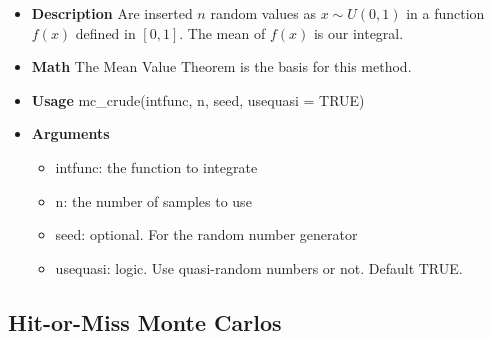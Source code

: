 \documentclass{article}
\begin{document}
\begin{itemize}
    \item \textbf{Description}\newline
    Are inserted $n$ random values as $x \sim U(0, 1)$ in a function $f(x)$ defined in $[0,1]$. The mean of $f(x)$ is our integral.
    
    \item \textbf{Math}\newline
    The Mean Value Theorem is the basis for this method.
    
    \item \textbf{Usage}\newline
    mc\_crude(intfunc, n, seed, usequasi = TRUE)
    
    \item \textbf{Arguments}
    
    \begin{itemize}
        \item intfunc:   the function to integrate
        \item n:         the number of samples to use
        \item seed:      optional. For the random number generator
        \item usequasi:  logic. Use quasi-random numbers or not. Default TRUE.
    \end{itemize}

\end{itemize}

\subsection{Hit-or-Miss Monte Carlos}
\end{document}
